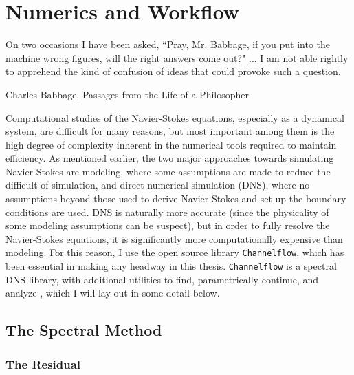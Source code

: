 \chapter{Numerics and Workflow}

    	 	\epigraph{On two occasions I have been asked, ``Pray, Mr. Babbage, if you put into the machine wrong figures, will the right answers come out?" ... I am not able rightly to apprehend the kind of confusion of ideas that could provoke such a question.}{Charles Babbage, Passages from the Life of a Philosopher}

Computational studies of the Navier-Stokes equations, especially as a dynamical system, are difficult for many reasons, but most important among them is the high degree of complexity inherent in the numerical tools required to maintain efficiency. As mentioned earlier, the two major approaches towards simulating Navier-Stokes are modeling, where some assumptions are made to reduce the difficult of simulation, and direct numerical simulation (DNS), where no assumptions beyond those used to derive Navier-Stokes and set up the boundary conditions are used. DNS is naturally more accurate (since the physicality of some modeling assumptions can be suspect), but in order to fully resolve the Navier-Stokes equations, it is significantly more computationally expensive than modeling. For this reason, I use the open source library {\tt Channelflow}, which has been essential in making any headway in this thesis. {\tt Channelflow} is a spectral DNS library, with additional utilities to find, parametrically continue, and analyze \ecs, which I will lay out in some detail below.
\section{The Spectral Method}
\subsection{The Residual}

